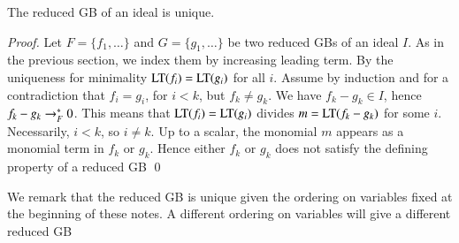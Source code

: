 \documentclass{llncs}
\begin{document}
\begin{lemma}  The reduced GB of an ideal is unique.
\end{lemma}

\begin{proof}  Let $F=\{f_1,\ldots\}$ and $G=\{g_1,\ldots\}$ 
be two reduced GBs of an ideal $I$.  As in the previous section, we index them
by increasing leading term.  By the uniqueness for minimality ${\hbox{LT}}(f_i)={\hbox{LT}}(g_i)$ for all
$i$.    Assume by induction and for a contradiction  that
$f_i = g_i$, for $i<k$, but $f_k\ne g_k$.  We have $f_k-g_k\in I$, hence
$f_k-g_k\rightarrow^*_F 0$.  This means that ${\hbox{LT}}(f_i)={\hbox{LT}}(g_i)$ divides $m = {\hbox{LT}}(f_k-g_k)$ for some
$i$.  Necessarily, $i<k$, so $i\ne k$.   Up to a scalar, the monomial $m$ 
appears as a monomial term in $f_k$ or $g_k$.  Hence either $f_k$ or $g_k$ does not satisfy the defining property of a reduced GB
\qed
\end{proof}

We remark that the reduced GB is unique given the ordering on variables fixed
at the beginning of these notes.   A different ordering on variables will give a different
reduced GB
\end{document}
